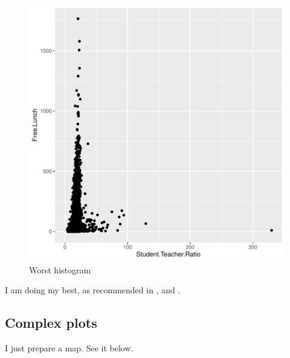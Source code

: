 \documentclass[a4paper, 12pt]{article}
\begin{document}
\begin{figure}[h]
\centering
\includegraphics{draft_paper_v2-theDeli_3}
\caption{Worst histogram}  %
\label{fig:theDeli_3} %
\end{figure}

I am doing my best, as recommended in \citet{magallanes_reyes_data_2022}, and \citet{leisch_sweave_2024}.



\subsection{Complex plots}

I just prepare a map. See it below.
\end{document}

